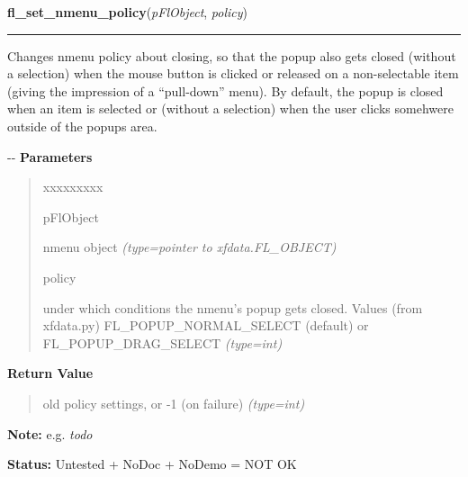     \vspace{0.5ex}

\hspace{.8\funcindent}\begin{boxedminipage}{\funcwidth}

    \raggedright \textbf{fl\_set\_nmenu\_policy}(\textit{pFlObject}, \textit{policy})

    \vspace{-1.5ex}

    \rule{\textwidth}{0.5\fboxrule}
\setlength{\parskip}{2ex}

Changes nmenu policy about closing, so that the popup also gets closed
(without a selection) when the mouse button is clicked or released on a
non-selectable item (giving the impression of a ``pull-down'' menu). By
default, the popup is closed when an item is selected or (without a
selection) when the user clicks somehwere outside of the popups area.

-{}-
\setlength{\parskip}{1ex}
      \textbf{Parameters}
      \vspace{-1ex}

      \begin{quote}
        \begin{Ventry}{xxxxxxxxx}

          \item[pFlObject]


nmenu object
            {\it (type=pointer to xfdata.FL\_OBJECT)}

          \item[policy]


under which conditions the nmenu's popup gets closed. Values (from
xfdata.py) FL\_POPUP\_NORMAL\_SELECT (default) or FL\_POPUP\_DRAG\_SELECT
            {\it (type=int)}

        \end{Ventry}

      \end{quote}

      \textbf{Return Value}
    \vspace{-1ex}

      \begin{quote}

old policy settings, or -1 (on failure)
      {\it (type=int)}

      \end{quote}

\textbf{Note:} 
e.g. \emph{todo}


\textbf{Status:} 
Untested + NoDoc + NoDemo = NOT OK


    \end{boxedminipage}

